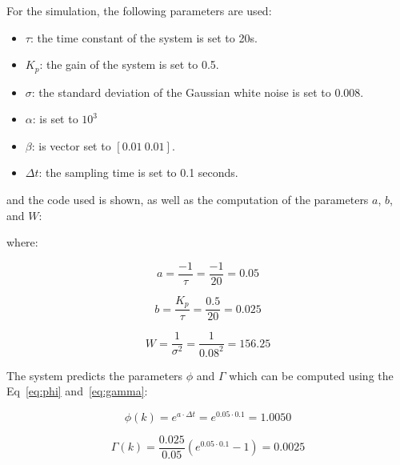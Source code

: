 

For the simulation, the following parameters are used:

\begin{itemize}
    \item $\tau$: the time constant of the system is set to 20s.

    \item $K_{p}$: the gain of the system is set to 0.5.

    \item $\sigma$: the standard deviation of the Gaussian white noise is set to 0.008.

    \item $\alpha$: is set to $10^{3}$

    \item $\beta$: is vector set to $\left[ 0.01 ~ 0.01 \right]$.

    \item $\Delta t$: the sampling time is set to 0.1 seconds.
\end{itemize}

and the code used is shown, as well as the computation of the parameters $a$, $b$, and $W$:



where:

\begin{equation}
    a = \frac{-1}{\tau} = \frac{-1}{20} = 0.05
\end{equation}

\begin{equation}
    b = \frac{K_{p}}{\tau} = \frac{0.5}{20} = 0.025
\end{equation}

\begin{equation}
    W = \frac{1}{\sigma^{2}} = \frac{1}{0.08^{2}} = 156.25
\end{equation}

The system predicts the parameters $\phi$ and $\Gamma$ which can be computed using the Eq~\ref{eq:phi} and~\ref{eq:gamma}:

\begin{equation}
    \phi(k) = e^{a \cdot \Delta t} = e^{0.05 \cdot 0.1} = 1.0050
\end{equation}

\begin{equation}
    \Gamma(k) = \frac{0.025}{0.05} \left( e^{0.05 \cdot 0.1} - 1\right) = 0.0025
\end{equation}

